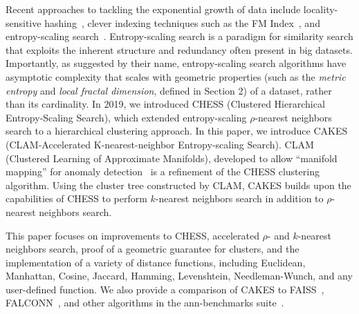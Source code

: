 Recent approaches to tackling the exponential growth of data include locality-sensitive hashing~\cite{bingham2001random}, 
clever indexing techniques such as the FM Index~\cite{ferragina2005indexing}, and entropy-scaling search~\cite{yu2015entropy, ishaq2019clustered}. 
Entropy-scaling search is a paradigm for similarity search that exploits the inherent structure and redundancy often present in big datasets.
Importantly, as suggested by their name, entropy-scaling search algorithms have asymptotic complexity that scales with geometric properties (such as the 
\emph{metric entropy} and \emph{local fractal dimension}, defined in Section 2) of a dataset,
rather than its cardinality. In 2019, we introduced CHESS (Clustered Hierarchical Entropy-Scaling Search), which extended entropy-scaling $\rho$-nearest 
neighbors search to a hierarchical clustering approach. In this paper, we introduce CAKES (CLAM-Accelerated K-nearest-neighbor 
Entropy-scaling Search). CLAM (Clustered Learning of Approximate Manifolds), developed to allow ``manifold mapping'' for anomaly detection~\cite{ishaq2021clustered} is a refinement of the CHESS clustering algorithm. Using the cluster tree constructed by CLAM, CAKES builds upon the capabilities of CHESS to perform 
$k$-nearest neighbors search in addition to $\rho$-nearest neighbors search.


This paper focuses on improvements to CHESS, accelerated $\rho$- and $k$-nearest neighbors search, proof of a geometric guarantee for clusters, 
and the implementation of a variety of distance functions, including Euclidean, Manhattan, Cosine, Jaccard, Hamming, Levenshtein, Needleman-Wunch, 
and any user-defined function. We also provide a comparison of CAKES to FAISS~\cite{johnson2019billion}, FALCONN~\cite{andoni2015practical}, and
other algorithms in the ann-benchmarks suite~\cite{wang2017ann}.
